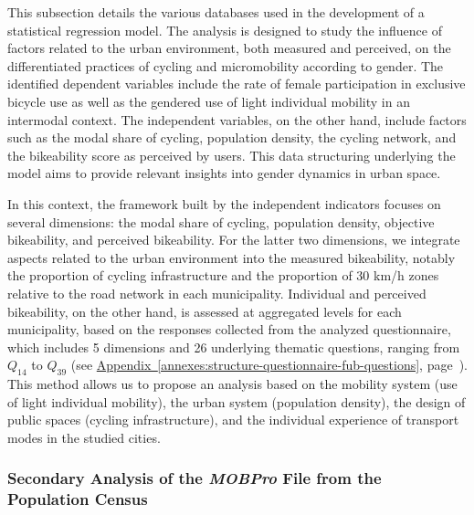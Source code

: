 \begin{refsegment}
This subsection details the various databases used in the development of a statistical regression model. The analysis is designed to study the influence of factors related to the urban environment, both measured and perceived, on the differentiated practices of cycling and micromobility according to gender. The identified dependent variables include the rate of female participation in exclusive bicycle use as well as the gendered use of light individual mobility in an intermodal context. The independent variables, on the other hand, include factors such as the modal share of cycling, population density, the cycling network, and the bikeability score as perceived by users. This data structuring underlying the model aims to provide relevant insights into gender dynamics in urban space. %

In this context, the framework built by the independent indicators focuses on several dimensions: the modal share of cycling, population density, objective bikeability, and perceived bikeability. For the latter two dimensions, we integrate aspects related to the urban environment into the measured bikeability, notably the proportion of cycling infrastructure and the proportion of 30 km/h zones relative to the road network in each municipality. Individual and perceived bikeability, on the other hand, is assessed at aggregated levels for each municipality, based on the responses collected from the analyzed questionnaire, which includes 5 dimensions and 26 underlying thematic questions, ranging from \(Q_{14}\) to \(Q_{39}\) (see \hyperref[annexes:structure-questionnaire-fub-questions]{Appendix~\ref{annexes:structure-questionnaire-fub-questions}}, page~\pageref{annexes:structure-questionnaire-fub-questions}). This method allows us to propose an analysis based on the mobility system (use of light individual mobility), the urban system (population density), the design of public spaces (cycling infrastructure), and the individual experience of transport modes in the studied cities. %

\subsubsection*{Secondary Analysis of the \textsl{MOBPro} File from the Population Census
    \label{source-mobpro}
    }


\end{refsegment}
